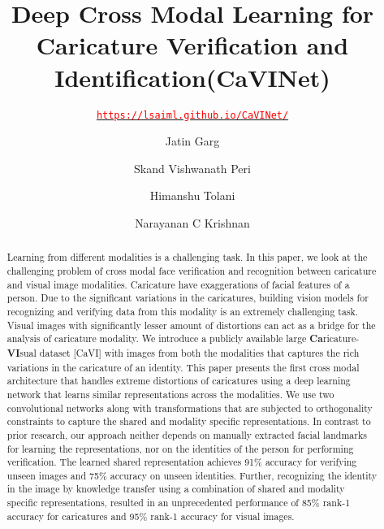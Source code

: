 \documentclass[sigconf]{acmart}
\begin{document}
\title{Deep Cross Modal Learning for Caricature Verification and Identification(CaVINet)}

\author{Jatin Garg}
 
\author{Skand Vishwanath Peri}\authornotemark[1]
  
\author{Himanshu Tolani}\authornotemark[1]
  
\author{Narayanan C Krishnan}



\subtitle{\href{https://lsaiml.github.io/CaVINet/}{\texttt{\textcolor{red}{https://lsaiml.github.io/CaVINet/}}}}



\renewcommand{\shortauthors}{Jatin Garg, Skand V Peri, Himanshu Tolani, and Narayanan C Krishnan}



\begin{abstract}
Learning from different modalities is a challenging task. In this paper, we look at the challenging problem of cross modal face verification and recognition between caricature and visual image modalities. Caricature have exaggerations of facial features of a person. Due to the significant variations in the caricatures, building vision models for recognizing and verifying data from this modality is an extremely challenging task. Visual images with significantly lesser amount of distortions can act as a bridge for the analysis of caricature modality. We introduce a publicly available large \textbf{Ca}ricature-\textbf{VI}sual  dataset [CaVI] with images from both the modalities that captures the rich variations in the caricature of an identity. This paper presents the first cross modal architecture that handles extreme distortions of caricatures using a deep learning network that learns similar representations across the modalities. We use two convolutional networks along with transformations that are subjected to orthogonality constraints to capture the shared and modality specific representations. In contrast to prior research, our approach neither depends on manually extracted facial landmarks for learning the representations, nor on the identities of the person for performing verification. The learned shared representation achieves 91\% accuracy for verifying unseen images and 75\% accuracy on unseen identities. Further, recognizing the identity in the image by knowledge transfer using a combination of shared and modality specific representations, resulted in an unprecedented performance of 85\% rank-1 accuracy for caricatures and 95\% rank-1 accuracy for visual images.
\end{abstract}
\end{document}
